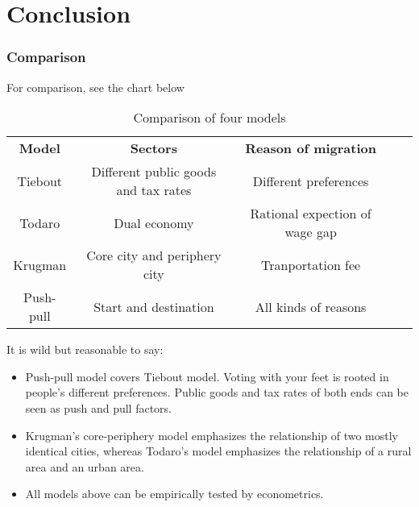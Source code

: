 \documentclass{article}
\numberwithin{equation}{section} %
\begin{document}
\part{Conclusion}
\section{Comparison} %
\label{sec:comparison}
For comparison, see the chart below
\begin{table}[h]
    \centering
    \begin{tabular}{ccccc}
         \textbf{Model}&  \textbf{Sectors}&  \textbf{Reason of migration}& \\
         Tiebout&  Different public goods and tax rates&   Different preferences& \\
         Todaro&  Dual economy&   Rational expection of wage gap& \\
         Krugman&  Core city and periphery city&   Tranportation fee& \\
         Push-pull&  Start and destination&   All kinds of reasons& \\
    \end{tabular}
    \caption{Comparison of four models}
    \label{tab:comparison}
\end{table}

It is wild but reasonable to say:
\begin{itemize}
  \item Push-pull model covers Tiebout model. Voting with your feet is rooted in people's different preferences. Public goods and tax rates of both ends can be seen as push and pull factors.
  \item Krugman's core-periphery model emphasizes the relationship of two mostly identical cities, whereas Todaro's model emphasizes the relationship of a rural area and an urban area.
  \item All models above can be empirically tested by econometrics.
\end{itemize}



\end{document}
